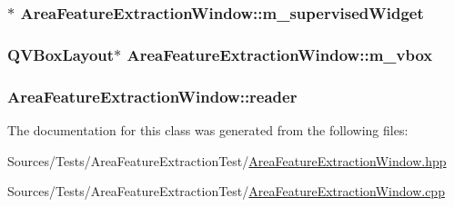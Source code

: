 \hypertarget{class_area_feature_extraction_window_a5e92f22f7471682136650c210abb34d3}{
\subsubsection[{m\+\_\+supervised\+Widget}]{$\ast$ Area\+Feature\+Extraction\+Window\+::m\+\_\+supervised\+Widget\hspace{0.3cm}{\ttfamily [private]}}}\label{class_area_feature_extraction_window_a5e92f22f7471682136650c210abb34d3}
\hypertarget{class_area_feature_extraction_window_ab76bcfe16b8e327f97114dd56787eaec}{
\subsubsection[{m\+\_\+vbox}]{\setlength{\rightskip}{0pt plus 5cm}Q\+V\+Box\+Layout$\ast$ Area\+Feature\+Extraction\+Window\+::m\+\_\+vbox\hspace{0.3cm}{\ttfamily [private]}}}\label{class_area_feature_extraction_window_ab76bcfe16b8e327f97114dd56787eaec}
\hypertarget{class_area_feature_extraction_window_a428a7715193feb571ec8ba70fe55fc4d}{
\subsubsection[{reader}]{ Area\+Feature\+Extraction\+Window\+::reader\hspace{0.3cm}{\ttfamily [private]}}}\label{class_area_feature_extraction_window_a428a7715193feb571ec8ba70fe55fc4d}


The documentation for this class was generated from the following files\+:\begin{DoxyCompactItemize}
\item 
Sources/\+Tests/\+Area\+Feature\+Extraction\+Test/\hyperlink{_area_feature_extraction_window_8hpp}{Area\+Feature\+Extraction\+Window.\+hpp}\item 
Sources/\+Tests/\+Area\+Feature\+Extraction\+Test/\hyperlink{_area_feature_extraction_window_8cpp}{Area\+Feature\+Extraction\+Window.\+cpp}\end{DoxyCompactItemize}
